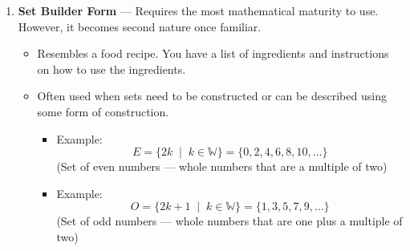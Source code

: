 \begin{enumerate}
  \item \textbf{Set Builder Form} --- Requires the most mathematical maturity to use. However, it becomes second nature once familiar.
	\begin{itemize}
	  \item Resembles a food recipe. You have a list of ingredients and instructions on how to use the ingredients.
	  \item Often used when sets need to be constructed or can be described using some form of construction.
		\begin{itemize}
		  \item Example:
			\[
			  E = \{2k \;\mid\; k \in \mathbb{W}\} = \{0,2,4,6,8,10,\ldots\}
			\]
			(Set of even numbers --- whole numbers that are a multiple of two)
		  \item Example:
			\[
			  O = \{2k+1 \;\mid\; k \in \mathbb{W}\} = \{1,3,5,7,9,\ldots\}
			\]
			(Set of odd numbers --- whole numbers that are one plus a multiple of two)
		\end{itemize}
	\end{itemize}
\end{enumerate}

